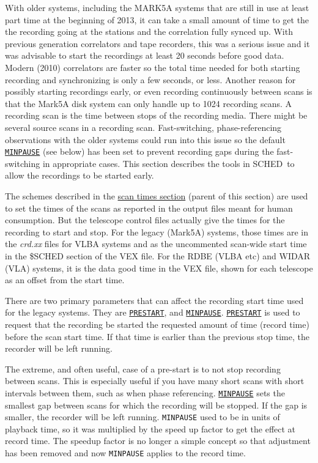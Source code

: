 \documentclass{report}
\newcommand{\schedb}{{\sc SCHED~}}
\begin{document}
With older systems, including the MARK5A systems that are still in use
at least part time at the beginning of 2013, it can take a small
amount of time to get the the recording going at the stations and the
correlation fully synced up.  With previous generation correlators and
tape recorders, this was a serious issue and it was advisable to start
the recordings at least 20 seconds before good data.  Modern (2010)
correlators are faster so the total time needed for both starting
recording and synchronizing is only a few seconds, or less.  Another
reason for possibly starting recordings early, or even recording
continuously between scans is that the Mark5A disk system can only
handle up to 1024 recording scans.  A recording scan is the time
between stops of the recording media.  There might be several source
scans in a recording scan.  Fast-switching, phase-referencing
observations with the older systems could run into this issue so the
default 
{\hyperref[MP:MINPAUSE]{{\tt MINPAUSE}}} (see below) has been set
to prevent recording gaps during the fast-switching in appropriate cases.
This section describes the tools in \schedb to allow the recordings to
be started early.

The schemes described in the 
{\hyperref[SSEC:SCANTIMES]{scan times section}}
(parent of this section) are used to set the
times of the scans as reported in the output files meant for human
consumption.  But the telescope control files actually give the times
for the recording to start and stop.  For the legacy (Mark5A) systems,
those times are in the {\sl crd.xx} files for VLBA systems and as the
uncommented scan-wide start time in the \$SCHED section of the VEX
file.  For the RDBE (VLBA etc) and WIDAR (VLA) systems, it is the data
good time in the VEX file, shown for each telescope as an offset from
the start time.

There are two primary parameters that can affect the
recording start time used for the legacy systems.  They are
{\hyperref[MP:PRESTART]{{\tt PRESTART}}}, and 
{\hyperref[MP:MINPAUSE]{{\tt MINPAUSE}}}.  
{\hyperref[MP:PRESTART]{{\tt PRESTART}}}
is used to request that the recording be started the requested
amount of time (record time) before the scan start time.  If that time
is earlier than the previous stop time, the recorder will be left
running.  

The extreme, and often useful, case of a pre-start is to not stop
recording between scans.  This is especially useful if you have many
short scans with short intervals between them, such as when phase
referencing.  
{\hyperref[MP:MINPAUSE]{{\tt MINPAUSE}}} sets the smallest
gap between scans for which the recording will be stopped.  If the gap
is smaller, the recorder will be left running.  {\tt MINPAUSE} used to
be in units of playback time, so it was multiplied by the speed up
factor to get the effect at record time.  The speedup factor is no
longer a simple concept so that adjustment has been removed and now
{\tt MINPAUSE} applies to the record time.
\end{document}
